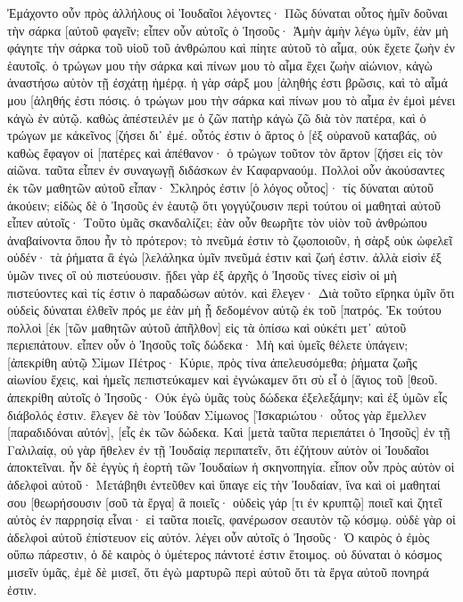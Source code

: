 Ἐμάχοντο οὖν πρὸς ἀλλήλους οἱ Ἰουδαῖοι λέγοντες· Πῶς δύναται οὗτος ἡμῖν δοῦναι τὴν σάρκα [αὐτοῦ φαγεῖν; 
εἶπεν οὖν αὐτοῖς ὁ Ἰησοῦς· Ἀμὴν ἀμὴν λέγω ὑμῖν, ἐὰν μὴ φάγητε τὴν σάρκα τοῦ υἱοῦ τοῦ ἀνθρώπου καὶ πίητε αὐτοῦ τὸ αἷμα, οὐκ ἔχετε ζωὴν ἐν ἑαυτοῖς. 
ὁ τρώγων μου τὴν σάρκα καὶ πίνων μου τὸ αἷμα ἔχει ζωὴν αἰώνιον, κἀγὼ ἀναστήσω αὐτὸν τῇ ἐσχάτῃ ἡμέρᾳ. 
ἡ γὰρ σάρξ μου [ἀληθής ἐστι βρῶσις, καὶ τὸ αἷμά μου [ἀληθής ἐστι πόσις. 
ὁ τρώγων μου τὴν σάρκα καὶ πίνων μου τὸ αἷμα ἐν ἐμοὶ μένει κἀγὼ ἐν αὐτῷ. 
καθὼς ἀπέστειλέν με ὁ ζῶν πατὴρ κἀγὼ ζῶ διὰ τὸν πατέρα, καὶ ὁ τρώγων με κἀκεῖνος [ζήσει δι᾽ ἐμέ. 
οὗτός ἐστιν ὁ ἄρτος ὁ [ἐξ οὐρανοῦ καταβάς, οὐ καθὼς ἔφαγον οἱ [πατέρες καὶ ἀπέθανον· ὁ τρώγων τοῦτον τὸν ἄρτον [ζήσει εἰς τὸν αἰῶνα. 
ταῦτα εἶπεν ἐν συναγωγῇ διδάσκων ἐν Καφαρναούμ. 
Πολλοὶ οὖν ἀκούσαντες ἐκ τῶν μαθητῶν αὐτοῦ εἶπαν· Σκληρός ἐστιν [ὁ λόγος οὗτος]· τίς δύναται αὐτοῦ ἀκούειν; 
εἰδὼς δὲ ὁ Ἰησοῦς ἐν ἑαυτῷ ὅτι γογγύζουσιν περὶ τούτου οἱ μαθηταὶ αὐτοῦ εἶπεν αὐτοῖς· Τοῦτο ὑμᾶς σκανδαλίζει; 
ἐὰν οὖν θεωρῆτε τὸν υἱὸν τοῦ ἀνθρώπου ἀναβαίνοντα ὅπου ἦν τὸ πρότερον; 
τὸ πνεῦμά ἐστιν τὸ ζῳοποιοῦν, ἡ σὰρξ οὐκ ὠφελεῖ οὐδέν· τὰ ῥήματα ἃ ἐγὼ [λελάληκα ὑμῖν πνεῦμά ἐστιν καὶ ζωή ἐστιν. 
ἀλλὰ εἰσὶν ἐξ ὑμῶν τινες οἳ οὐ πιστεύουσιν. ᾔδει γὰρ ἐξ ἀρχῆς ὁ Ἰησοῦς τίνες εἰσὶν οἱ μὴ πιστεύοντες καὶ τίς ἐστιν ὁ παραδώσων αὐτόν. 
καὶ ἔλεγεν· Διὰ τοῦτο εἴρηκα ὑμῖν ὅτι οὐδεὶς δύναται ἐλθεῖν πρός με ἐὰν μὴ ᾖ δεδομένον αὐτῷ ἐκ τοῦ [πατρός. 
Ἐκ τούτου πολλοὶ [ἐκ [τῶν μαθητῶν αὐτοῦ ἀπῆλθον] εἰς τὰ ὀπίσω καὶ οὐκέτι μετ᾽ αὐτοῦ περιεπάτουν. 
εἶπεν οὖν ὁ Ἰησοῦς τοῖς δώδεκα· Μὴ καὶ ὑμεῖς θέλετε ὑπάγειν; 
[ἀπεκρίθη αὐτῷ Σίμων Πέτρος· Κύριε, πρὸς τίνα ἀπελευσόμεθα; ῥήματα ζωῆς αἰωνίου ἔχεις, 
καὶ ἡμεῖς πεπιστεύκαμεν καὶ ἐγνώκαμεν ὅτι σὺ εἶ ὁ [ἅγιος τοῦ [θεοῦ. 
ἀπεκρίθη αὐτοῖς ὁ Ἰησοῦς· Οὐκ ἐγὼ ὑμᾶς τοὺς δώδεκα ἐξελεξάμην; καὶ ἐξ ὑμῶν εἷς διάβολός ἐστιν. 
ἔλεγεν δὲ τὸν Ἰούδαν Σίμωνος [Ἰσκαριώτου· οὗτος γὰρ ἔμελλεν [παραδιδόναι αὐτόν], [εἷς ἐκ τῶν δώδεκα. 
Καὶ [μετὰ ταῦτα περιεπάτει ὁ Ἰησοῦς] ἐν τῇ Γαλιλαίᾳ, οὐ γὰρ ἤθελεν ἐν τῇ Ἰουδαίᾳ περιπατεῖν, ὅτι ἐζήτουν αὐτὸν οἱ Ἰουδαῖοι ἀποκτεῖναι. 
ἦν δὲ ἐγγὺς ἡ ἑορτὴ τῶν Ἰουδαίων ἡ σκηνοπηγία. 
εἶπον οὖν πρὸς αὐτὸν οἱ ἀδελφοὶ αὐτοῦ· Μετάβηθι ἐντεῦθεν καὶ ὕπαγε εἰς τὴν Ἰουδαίαν, ἵνα καὶ οἱ μαθηταί σου [θεωρήσουσιν [σοῦ τὰ ἔργα] ἃ ποιεῖς· 
οὐδεὶς γάρ [τι ἐν κρυπτῷ] ποιεῖ καὶ ζητεῖ αὐτὸς ἐν παρρησίᾳ εἶναι· εἰ ταῦτα ποιεῖς, φανέρωσον σεαυτὸν τῷ κόσμῳ. 
οὐδὲ γὰρ οἱ ἀδελφοὶ αὐτοῦ ἐπίστευον εἰς αὐτόν. 
λέγει οὖν αὐτοῖς ὁ Ἰησοῦς· Ὁ καιρὸς ὁ ἐμὸς οὔπω πάρεστιν, ὁ δὲ καιρὸς ὁ ὑμέτερος πάντοτέ ἐστιν ἕτοιμος. 
οὐ δύναται ὁ κόσμος μισεῖν ὑμᾶς, ἐμὲ δὲ μισεῖ, ὅτι ἐγὼ μαρτυρῶ περὶ αὐτοῦ ὅτι τὰ ἔργα αὐτοῦ πονηρά ἐστιν. 
